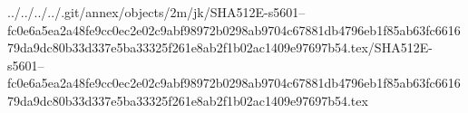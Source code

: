 ../../../../.git/annex/objects/2m/jk/SHA512E-s5601--fc0e6a5ea2a48fe9cc0ec2e02c9abf98972b0298ab9704c67881db4796eb1f85ab63fc661679da9dc80b33d337e5ba33325f261e8ab2f1b02ac1409e97697b54.tex/SHA512E-s5601--fc0e6a5ea2a48fe9cc0ec2e02c9abf98972b0298ab9704c67881db4796eb1f85ab63fc661679da9dc80b33d337e5ba33325f261e8ab2f1b02ac1409e97697b54.tex